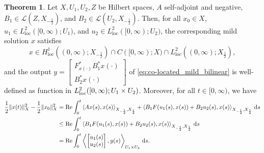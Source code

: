 \documentclass{cocv}
\renewcommand{\Re}{\mathrm{Re}}
\newcommand{\ds}{ {\, \rm d} s}
\newcommand{\inprod}[2]{\left\langle#1,#2\right\rangle}
\DeclareMathOperator{\loc}{loc}
\newcommand{\B}{\mathbb{B}}
\theoremstyle{definition}
\newtheorem{theorem}{Theorem}
\begin{document}
\begin{theorem}\label{th:passivity_unbounded}
    Let $X, U_1, U_2, Z$ be Hilbert spaces, $A$ self-adjoint and negative, $B_1\in \mathcal{L}(Z,X_{-\frac{1}{2}})$, and $B_2\in \mathcal{L}(U_2,X_{-\frac12})$. Then, for all $x_0 \in X$, $u_1\in L^{2}_{\loc}([0,\infty);U_1)$, and $u_2\in L^{2}_{\loc}([0,\infty);U_2)$, the corresponding mild solution $x$ satisfies 
    \begin{equation*}
        x \in H^1_{\loc}((0,\infty); X_{-\frac{1}{2}}) \cap C([0, \infty); X) \cap L^2_{\loc}((0, \infty); X_{\frac{1}{2}}),
    \end{equation*}
and the output $y= \left[\begin{smallmatrix} F_{x(\cdot)}^*B_1^*x(\cdot)\\B_2^*x(\cdot)\end{smallmatrix}\right]$ of \eqref{eq:co-located_mild_bilinear} is well-defined as function in $L^2_{\rm loc}([0,\infty);U_1 \times U_2)$. Moreover, for all $ t \in [0, \infty) $, we have
\begin{align*}
\frac12\|x(t)\|_X^2 - \frac12\|x_0\|_X^2
&= \Re\int_0^t \inprod{Ax(s)}{x(s)}_{X_{-\frac12},X_{\frac12}} + \inprod{B_1F(u_1(s),x(s)) + B_2u_2(s)}{x(s)}_{X_{-\frac12},X_{\frac12}} \ds \\ 
&\leq \Re\int_0^t  \inprod{B_1F(u_1(s),x(s)) + B_2u_2(s)}{x(s)}_{X_{-\frac12},X_{\frac12}} \ds\\
&= \Re\int_0^t \left\langle \begin{bmatrix}u_1(s)\\u_2(s)\end{bmatrix}, y(s) \right\rangle_{U_1\times U_2} \ds.
\end{align*}
\end{theorem}
\end{document}
